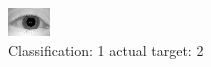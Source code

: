 \begin{figure}[h!]
\begin{center}
\includegraphics[width=0.60\columnwidth]{figures/ID939_class_1_target_2.png}
\end{center}
\caption{ Classification: 1 actual target: 2}
\label{fig:ID939_class_1_target_2}
\end{figure}
